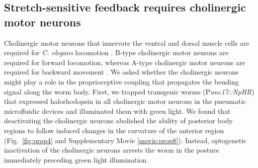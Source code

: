 \subsection{Stretch-sensitive feedback requires cholinergic motor neurons }
 
Cholinergic motor neurons that innervate the ventral and dorsal muscle cells are required for \textit{C. elegans} locomotion \citep{chalfie_neural_1985,leifer_optogenetic_2011}. B-type cholinergic motor neurons are required for forward 
locomotion, whereas A-type cholinergic motor neurons are required for backward movement 
\citep{chalfie_neural_1985}. We asked whether the cholinergic neurons might play a role in the proprioceptive coupling  that propagates the bending signal along the worm body. First, we trapped transgenic worms 
(P\textit{unc17::NpHR}) that expressed halorhodopsin in all cholinergic motor neurons in the pneumatic 
microfluidic devices and illuminated them with green light. We found that deactivating the 
cholinergic neurons abolished the ability of posterior body regions to follow induced changes in 
the curvature of the anterior region (Fig.~\ref{fig:prop4} and Supplementary Movie  \ref{movie:prop8}). Instead, optogenetic 
inactivation of the cholinergic neurons arrests the worm in the posture immediately preceding 
green light illumination.  


